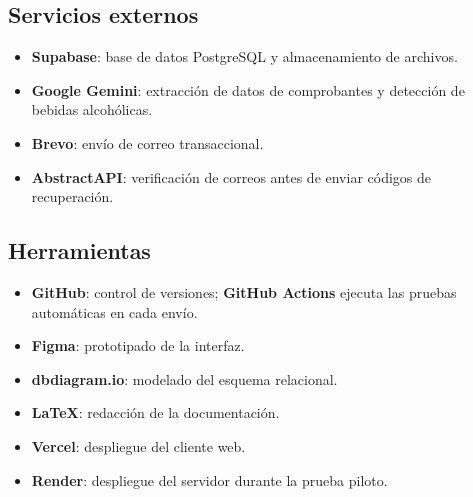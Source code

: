 \documentclass[11pt,letterpaper]{article}
\begin{document}
\subsection{Servicios externos}
\begin{itemize}
  \item \textbf{Supabase}: base de datos PostgreSQL y almacenamiento de archivos.
  \item \textbf{Google Gemini}: extracción de datos de comprobantes y detección de bebidas alcohólicas.
  \item \textbf{Brevo}: envío de correo transaccional.
  \item \textbf{AbstractAPI}: verificación de correos antes de enviar códigos de recuperación.
\end{itemize}

\subsection{Herramientas}
\begin{itemize}
  \item \textbf{GitHub}: control de versiones; \textbf{GitHub Actions} ejecuta las pruebas automáticas en cada envío.
  \item \textbf{Figma}: prototipado de la interfaz.
  \item \textbf{dbdiagram.io}: modelado del esquema relacional.
  \item \textbf{\LaTeX}: redacción de la documentación.
  \item \textbf{Vercel}: despliegue del cliente web.
  \item \textbf{Render}: despliegue del servidor durante la prueba piloto.
\end{itemize}
\end{document}

